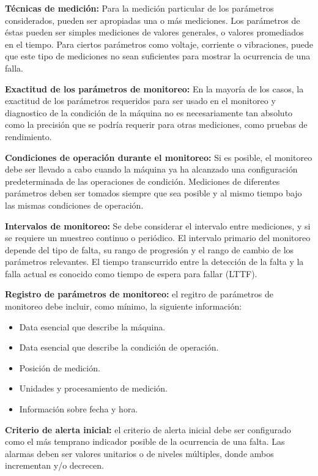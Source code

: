 \begin{description}
\item \textbf{Técnicas de medición:} Para la medición particular de los parámetros considerados, pueden ser apropiadas una o más mediciones. Los parámetros de éstas pueden ser simples mediciones de valores generales, o valores promediados en el tiempo. Para ciertos parámetros como voltaje, corriente o vibraciones, puede que este tipo de mediciones no sean suficientes para mostrar la ocurrencia de una falla.

\item \textbf{Exactitud de los parámetros de monitoreo:} En la mayoría de los casos, la exactitud de los parámetros requeridos para ser usado en el monitoreo y diagnostico de la condición de la máquina no es necesariamente tan absoluto como la precisión que se podría requerir para otras mediciones, como pruebas de rendimiento.

\item \textbf{Condiciones de operación durante el monitoreo:} Si es posible, el monitoreo debe ser llevado a cabo cuando la máquina ya ha alcanzado una configuración predeterminada de las operaciones de condición. Mediciones de diferentes parámetros deben ser tomados siempre que sea posible y al mismo tiempo bajo las mismas condiciones de operación.

\item \textbf{Intervalos de monitoreo:} Se debe considerar el intervalo entre mediciones, y si se requiere un muestreo continuo o periódico. El intervalo primario del monitoreo depende del tipo de falta, su rango de progresión y el rango de cambio de los parámetros relevantes. El tiempo transcurrido entre la detección de la falta y la falla actual es conocido como tiempo de espera para fallar (LTTF).

\item \textbf{Registro de parámetros de monitoreo:} el regitro de parámetros de monitoreo debe incluir, como mínimo, la siguiente información:
\begin{itemize}
\item Data esencial que describe la máquina.
\item Data esencial que describe la condición de operación.
\item Posición de medición.
\item Unidades y procesamiento de medición.
\item Información sobre fecha y hora.
\end{itemize}

\item \textbf{Criterio de alerta inicial:} el criterio de alerta inicial debe ser configurado  como el más temprano indicador posible de la ocurrencia de una falta. Las alarmas deben ser valores unitarios o de niveles múltiples, donde ambos incrementan y/o decrecen. 


\end{description}

